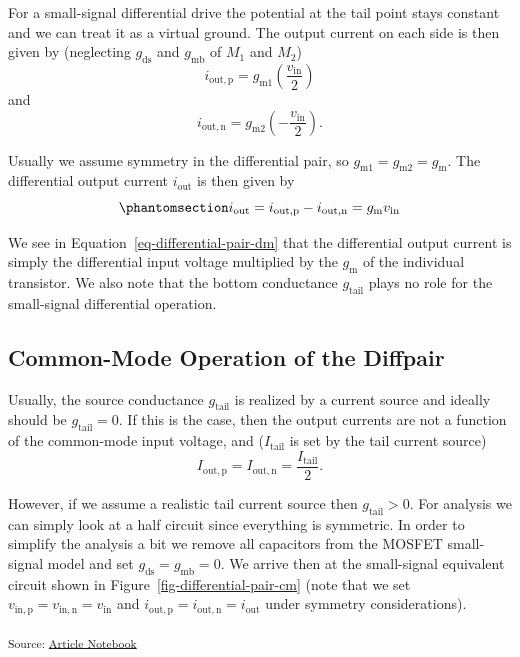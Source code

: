 \documentclass[
  a4paper,
  DIV=11,
  numbers=noendperiod]{scrartcl}
\begin{document}
For a small-signal differential drive the potential at the tail point
stays constant and we can treat it as a virtual ground. The output
current on each side is then given by (neglecting \(g_\mathrm{ds}\) and
\(g_\mathrm{mb}\) of \(M_1\) and \(M_2\)) \[
i_\mathrm{out,p} = g_\mathrm{m1} \left( \frac{v_\mathrm{in}}{2} \right)
\] and \[
i_\mathrm{out,n} = g_\mathrm{m2} \left( -\frac{v_\mathrm{in}}{2} \right).
\]

Usually we assume symmetry in the differential pair, so
\(g_\mathrm{m1} = g_\mathrm{m2} = g_\mathrm{m}\). The differential
output current \(i_\mathrm{out}\) is then given by
\begin{equation}\phantomsection\label{eq-differential-pair-dm}{
i_\mathrm{out} = i_\mathrm{out,p} - i_\mathrm{out,n} = g_\mathrm{m}v_\mathrm{in}
}\end{equation}

We see in Equation~\ref{eq-differential-pair-dm} that the differential
output current is simply the differential input voltage multiplied by
the \(g_\mathrm{m}\) of the individual transistor. We also note that the
bottom conductance \(g_\mathrm{tail}\) plays no role for the
small-signal differential operation.

\subsection{Common-Mode Operation of the
Diffpair}\label{common-mode-operation-of-the-diffpair}

Usually, the source conductance \(g_\mathrm{tail}\) is realized by a
current source and ideally should be \(g_\mathrm{tail} = 0\). If this is
the case, then the output currents are not a function of the common-mode
input voltage, and (\(I_\mathrm{tail}\) is set by the tail current
source) \[
I_\mathrm{out,p} = I_\mathrm{out,n} = \frac{I_\mathrm{tail}}{2}.
\]

However, if we assume a realistic tail current source then
\(g_\mathrm{tail} > 0\). For analysis we can simply look at a half
circuit since everything is symmetric. In order to simplify the analysis
a bit we remove all capacitors from the MOSFET small-signal model and
set \(g_\mathrm{ds}= g_\mathrm{mb}= 0\). We arrive then at the
small-signal equivalent circuit shown in
Figure~\ref{fig-differential-pair-cm} (note that we set
\(v_\mathrm{in,p} = v_\mathrm{in,n} = v_\mathrm{in}\) and
\(i_\mathrm{out,p} = i_\mathrm{out,n} = i_\mathrm{out}\) under symmetry
considerations).

\textsubscript{Source:
\href{https://iic-jku.github.io/analog-circuit-design/index.qmd.html}{Article
Notebook}}
\end{document}
